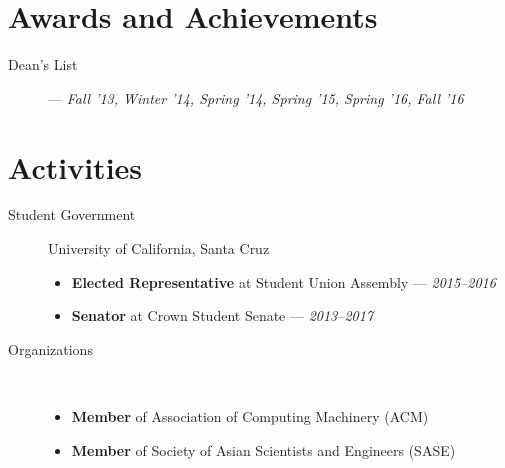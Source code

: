 \documentclass[11pt]{article}
\begin{document}
\section*{Awards and Achievements}
\begin{description}
  \item[Dean's List] --- \textit{Fall '13, Winter '14, Spring '14, Spring '15,
    Spring '16, Fall '16}
\end{description}

\section*{Activities}
\begin{description}
  \item[Student Government] University of California, Santa Cruz
    \begin{itemize}
      \item \textbf{Elected Representative} at Student Union Assembly ---
        \textit{2015--2016}
      \item \textbf{Senator} at Crown Student Senate --- \textit{2013--2017}
    \end{itemize}
  \item[Organizations] ~
    \begin{itemize}
      \item \textbf{Member} of Association of Computing Machinery (ACM)
      \item \textbf{Member} of Society of Asian Scientists and Engineers (SASE)
    \end{itemize}
\end{description}
\end{document}

